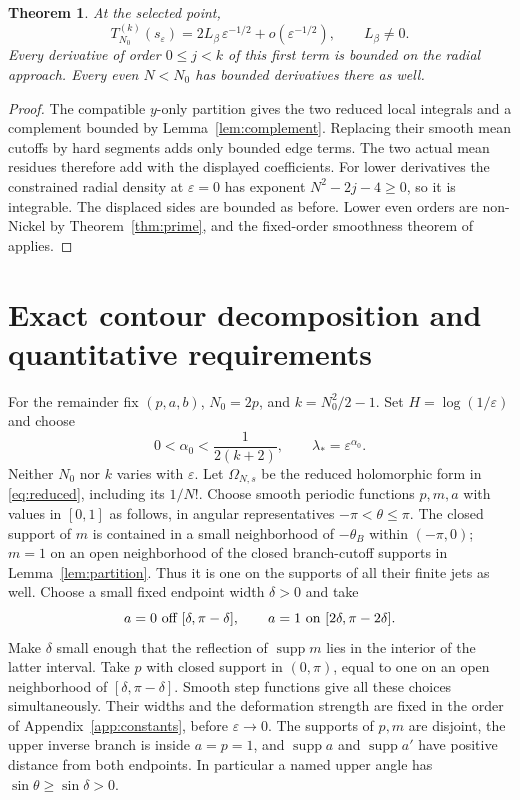 \documentclass[11pt]{article}
\numberwithin{equation}{section}
\newtheorem{theorem}{Theorem}[section]
\theoremstyle{definition}
\newcommand{\eps}{\varepsilon}
\newcommand{\se}{s_\varepsilon}
\begin{document}
\begin{theorem}\label{thm:first}
At the selected point,
\[
 T_{N_0}^{(k)}(\se)=2L_\beta\,\eps^{-1/2}+o(\eps^{-1/2}),
 \qquad L_\beta\ne0.
\]
Every derivative of order \(0\le j<k\) of this first term is bounded
on the radial approach. Every even \(N<N_0\) has bounded derivatives
there as well.
\end{theorem}
\begin{proof}
The compatible \(y\)-only partition gives the two reduced local
integrals and a complement bounded by Lemma~\ref{lem:complement}.
Replacing their smooth mean cutoffs by hard segments adds only bounded
edge terms. The two actual mean residues therefore add with the
displayed coefficients. For lower derivatives the constrained radial
density at \(\eps=0\)
has exponent \(N^2-2j-4\ge0\), so it is integrable.
The displaced sides are bounded as before. Lower even orders are
non-Nickel by Theorem~\ref{thm:prime}, and the fixed-order smoothness
theorem of \cite{TW2014} applies.
\end{proof}



\section{Exact contour decomposition and quantitative requirements}
\label{sec:tailreduction}
For the remainder fix \((p,a,b)\), \(N_0=2p\), and \(k=N_0^2/2-1\).
Set \(H=\log(1/\eps)\) and choose
\begin{equation}
 0<\alpha_0<\frac1{2(k+2)},\qquad \lambda_*=\eps^{\alpha_0}.
 \label{eq:alphachoice}
\end{equation}
Neither \(N_0\) nor \(k\) varies with \(\eps\).
Let \(\Omega_{N,s}\) be the reduced holomorphic form in
\eqref{eq:reduced}, including its \(1/N!\).
Choose smooth periodic functions \(p,m,a\) with values in \([0,1]\)
as follows, in angular representatives \(-\pi<\theta\le\pi\).
The closed support of \(m\) is contained in a small neighborhood of
\(-\theta_B\) within \((-\pi,0)\); \(m=1\) on an open neighborhood
of the closed branch-cutoff supports in Lemma~\ref{lem:partition}.
Thus it is one on the supports of all their finite jets as well.
Choose a small fixed endpoint width \(\delta>0\) and take
\[
 a=0\ \hbox{off }[\delta,\pi-\delta],\qquad
 a=1\ \hbox{on }[2\delta,\pi-2\delta].
\]
Make \(\delta\) small enough that the reflection of
\(\operatorname{supp}m\) lies in the interior of the latter interval.
Take \(p\) with closed support in \((0,\pi)\), equal to one on
an open neighborhood of \([\delta,\pi-\delta]\).
Smooth step functions give all these choices simultaneously.
Their widths and the deformation strength are fixed in the order
of Appendix~\ref{app:constants}, before \(\eps\to0\).
The supports of \(p,m\) are disjoint, the upper inverse branch is
inside \(a=p=1\), and \(\operatorname{supp}a\) and
\(\operatorname{supp}a'\) have positive distance from both endpoints.
In particular a named upper angle has \(\sin\theta\ge\sin\delta>0\).
\end{document}
